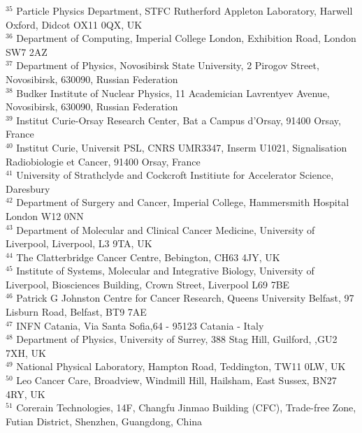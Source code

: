 {\begin{tabbing}
     $^{35}$ \> Particle Physics Department, STFC Rutherford Appleton Laboratory, Harwell Oxford, Didcot OX11 0QX, UK\\
     $^{36}$ \> Department of Computing, Imperial College London, Exhibition Road, London SW7 2AZ\\
     $^{37}$ \> Department of Physics, Novosibirsk State University, 2 Pirogov Street, Novosibirsk, 630090, Russian Federation\\
     $^{38}$ \> Budker Institute of Nuclear Physics, 11 Academician Lavrentyev Avenue, Novosibirsk, 630090, Russian Federation\\
     $^{39}$ \> Institut Curie-Orsay Research Center, Bat a Campus d'Orsay, 91400 Orsay, France\\
     $^{40}$ \> Institut Curie, Universit PSL, CNRS UMR3347, Inserm U1021, Signalisation Radiobiologie et Cancer, 91400 Orsay, France\\
     $^{41}$ \> University of Strathclyde and Cockcroft Institiute for Accelerator Science, Daresbury\\
     $^{42}$ \> Department of Surgery and Cancer, Imperial College, Hammersmith Hospital London W12 0NN\\
     $^{43}$ \> Department of Molecular and Clinical Cancer Medicine, University of Liverpool, Liverpool, L3 9TA, UK\\
     $^{44}$ \> The Clatterbridge Cancer Centre, Bebington, CH63 4JY, UK\\
     $^{45}$ \> Institute of Systems, Molecular and Integrative Biology, University of Liverpool, Biosciences Building, Crown Street, Liverpool L69 7BE\\
     $^{46}$ \> Patrick G Johnston Centre for Cancer Research, Queens University Belfast, 97 Lisburn Road, Belfast, BT9 7AE\\
     $^{47}$ \> INFN Catania, Via Santa Sofia,64 - 95123 Catania - Italy\\
     $^{48}$ \> Department of Physics, University of Surrey, 388 Stag Hill, Guilford, ,GU2 7XH, UK\\
     $^{49}$ \> National Physical Laboratory, Hampton Road, Teddington, TW11 0LW, UK\\
     $^{50}$ \> Leo Cancer Care, Broadview, Windmill Hill, Hailsham, East Sussex, BN27 4RY, UK\\
     $^{51}$ \> Corerain Technologies, 14F, Changfu Jinmao Building (CFC), Trade-free Zone, Futian District, Shenzhen, Guangdong, China\\
    ~   \> \\
  \end{tabbing}
}
